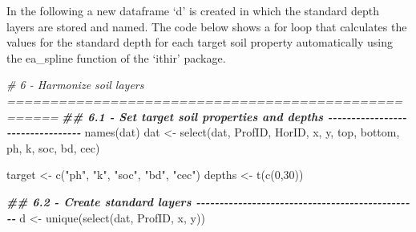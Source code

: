 \documentclass[
  10pt,
  b5paper,
  oneside]{book}
\newenvironment{Shaded}{\begin{snugshade}}{\end{snugshade}}
\newcommand{\CommentTok}[1]{\textcolor[rgb]{0.56,0.35,0.01}{\textit{#1}}}
\newcommand{\DecValTok}[1]{\textcolor[rgb]{0.00,0.00,0.81}{#1}}
\newcommand{\DocumentationTok}[1]{\textcolor[rgb]{0.56,0.35,0.01}{\textbf{\textit{#1}}}}
\newcommand{\FunctionTok}[1]{\textcolor[rgb]{0.00,0.00,0.00}{#1}}
\newcommand{\NormalTok}[1]{#1}
\newcommand{\OtherTok}[1]{\textcolor[rgb]{0.56,0.35,0.01}{#1}}
\newcommand{\StringTok}[1]{\textcolor[rgb]{0.31,0.60,0.02}{#1}}
\begin{document}
In the following a new dataframe `d' is created in which the standard depth layers are stored and named. The code below shows a for loop that calculates the values for the standard depth for each target soil property automatically using the ea\_spline function of the `ithir' package.

\begin{Shaded}
\begin{Highlighting}[]
\CommentTok{\# 6 {-} Harmonize soil layers ====================================================}
\DocumentationTok{\#\# 6.1 {-} Set target soil properties and depths {-}{-}{-}{-}{-}{-}{-}{-}{-}{-}{-}{-}{-}{-}{-}{-}{-}{-}{-}{-}{-}{-}{-}{-}{-}{-}{-}{-}{-}{-}{-}{-}{-}}
\FunctionTok{names}\NormalTok{(dat)}
\NormalTok{dat }\OtherTok{\textless{}{-}} \FunctionTok{select}\NormalTok{(dat, ProfID, HorID, x, y, top, bottom, ph, k, soc, bd, cec)}

\NormalTok{target }\OtherTok{\textless{}{-}} \FunctionTok{c}\NormalTok{(}\StringTok{"ph"}\NormalTok{, }\StringTok{"k"}\NormalTok{, }\StringTok{"soc"}\NormalTok{,  }\StringTok{"bd"}\NormalTok{, }\StringTok{"cec"}\NormalTok{)}
\NormalTok{depths }\OtherTok{\textless{}{-}} \FunctionTok{t}\NormalTok{(}\FunctionTok{c}\NormalTok{(}\DecValTok{0}\NormalTok{,}\DecValTok{30}\NormalTok{))}

\DocumentationTok{\#\# 6.2 {-} Create standard layers {-}{-}{-}{-}{-}{-}{-}{-}{-}{-}{-}{-}{-}{-}{-}{-}{-}{-}{-}{-}{-}{-}{-}{-}{-}{-}{-}{-}{-}{-}{-}{-}{-}{-}{-}{-}{-}{-}{-}{-}{-}{-}{-}{-}{-}{-}{-}{-}}
\NormalTok{d }\OtherTok{\textless{}{-}} \FunctionTok{unique}\NormalTok{(}\FunctionTok{select}\NormalTok{(dat, ProfID, x, y))}


\end{Highlighting}
\end{Shaded}
\end{document}
